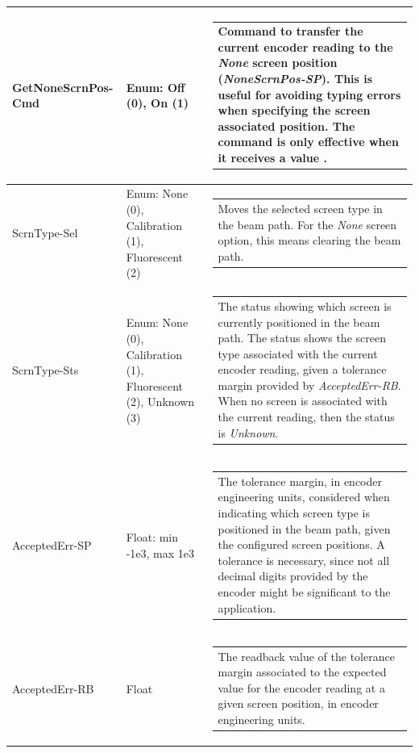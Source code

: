 \documentclass[openany]{article}
\begin{document}
\begin{longtable}{| m{4.5cm} m{2.5cm}  m{7.0cm} |}
        GetNoneScrnPos-Cmd & Enum: Off (0), On (1) & \begin{tabular}{@{}m{6cm}@{}}
                Command to transfer the current encoder reading to the \emph{None} screen position (\emph{NoneScrnPos-SP}). This is useful for avoiding typing errors when specifying the screen associated position. The command is only effective when it receives a value $\neq 0$.
            \end{tabular} \hypertarget{pv:scrn-type}{}\\ \hline
        ScrnType-Sel & Enum: None (0), Calibration (1), Fluorescent (2) & \begin{tabular}{@{}m{6cm}@{}}
                Moves the selected screen type in the beam path. For the \emph{None} screen option, this means clearing the beam path.
            \end{tabular} \hypertarget{}{}\\ \hline
        ScrnType-Sts & Enum: None (0), Calibration (1), Fluorescent (2), Unknown (3) & \begin{tabular}{@{}m{6cm}@{}}
                The status showing which screen is currently positioned in the beam path. The status shows the screen type associated with the current encoder reading, given a tolerance margin provided by \emph{AcceptedErr-RB}. When no screen is associated with the current reading, then the status is \emph{Unknown}.
            \end{tabular} \hypertarget{pv:accepted-err}{}\\ \hline
        AcceptedErr-SP & Float: min -1e3, max 1e3 & \begin{tabular}{@{}m{6cm}@{}}
                The tolerance margin, in encoder engineering units, considered when indicating which screen type is positioned in the beam path, given the configured screen positions. A tolerance is necessary, since not all decimal digits provided by the encoder might be significant to the application. 
            \end{tabular} \hypertarget{}{}\\ \hline
        AcceptedErr-RB & Float & \begin{tabular}{@{}m{6cm}@{}}
                The readback value of the tolerance margin associated to the expected value for the encoder reading at a given screen position, in encoder engineering units.
            \end{tabular} \hypertarget{pv:done-mov-mon}{}\\ \hline

\end{longtable}
\end{document}
